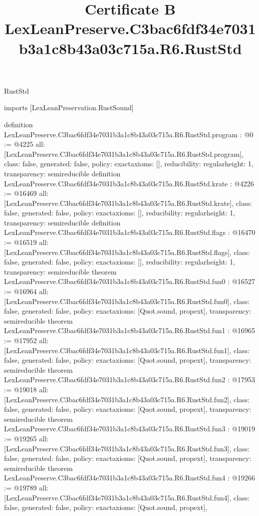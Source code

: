 \begin{lexlean}{RustStd}
\title{Certificate B LexLeanPreserve.C3bac6fdf34e7031b3a1c8b43a03c715a.R6.RustStd}
\begin{coremodule}
imports [LexLeanPreservation.RustSound]

definition LexLeanPreserve.C3bac6fdf34e7031b3a1c8b43a03c715a.R6.RustStd.program : @0 := @4225 {
  all: [LexLeanPreserve.C3bac6fdf34e7031b3a1c8b43a03c715a.R6.RustStd.program],
  class: false,
  generated: false,
  policy: exact{axioms: []},
  reducibility: regular{height: 1},
  transparency: semireducible
}
definition LexLeanPreserve.C3bac6fdf34e7031b3a1c8b43a03c715a.R6.RustStd.krate : @4226 := @16469 {
  all: [LexLeanPreserve.C3bac6fdf34e7031b3a1c8b43a03c715a.R6.RustStd.krate],
  class: false,
  generated: false,
  policy: exact{axioms: []},
  reducibility: regular{height: 1},
  transparency: semireducible
}
definition LexLeanPreserve.C3bac6fdf34e7031b3a1c8b43a03c715a.R6.RustStd.flags : @16470 := @16519 {
  all: [LexLeanPreserve.C3bac6fdf34e7031b3a1c8b43a03c715a.R6.RustStd.flags],
  class: false,
  generated: false,
  policy: exact{axioms: []},
  reducibility: regular{height: 1},
  transparency: semireducible
}
theorem LexLeanPreserve.C3bac6fdf34e7031b3a1c8b43a03c715a.R6.RustStd.fun0 : @16527 := @16964 {
  all: [LexLeanPreserve.C3bac6fdf34e7031b3a1c8b43a03c715a.R6.RustStd.fun0],
  class: false,
  generated: false,
  policy: exact{axioms: [Quot.sound, propext]},
  transparency: semireducible
}
theorem LexLeanPreserve.C3bac6fdf34e7031b3a1c8b43a03c715a.R6.RustStd.fun1 : @16965 := @17952 {
  all: [LexLeanPreserve.C3bac6fdf34e7031b3a1c8b43a03c715a.R6.RustStd.fun1],
  class: false,
  generated: false,
  policy: exact{axioms: [Quot.sound, propext]},
  transparency: semireducible
}
theorem LexLeanPreserve.C3bac6fdf34e7031b3a1c8b43a03c715a.R6.RustStd.fun2 : @17953 := @19018 {
  all: [LexLeanPreserve.C3bac6fdf34e7031b3a1c8b43a03c715a.R6.RustStd.fun2],
  class: false,
  generated: false,
  policy: exact{axioms: [Quot.sound, propext]},
  transparency: semireducible
}
theorem LexLeanPreserve.C3bac6fdf34e7031b3a1c8b43a03c715a.R6.RustStd.fun3 : @19019 := @19265 {
  all: [LexLeanPreserve.C3bac6fdf34e7031b3a1c8b43a03c715a.R6.RustStd.fun3],
  class: false,
  generated: false,
  policy: exact{axioms: [Quot.sound, propext]},
  transparency: semireducible
}
theorem LexLeanPreserve.C3bac6fdf34e7031b3a1c8b43a03c715a.R6.RustStd.fun4 : @19266 := @19789 {
  all: [LexLeanPreserve.C3bac6fdf34e7031b3a1c8b43a03c715a.R6.RustStd.fun4],
  class: false,
  generated: false,
  policy: exact{axioms: [Quot.sound, propext]},
}
\end{coremodule}
\end{lexlean}
